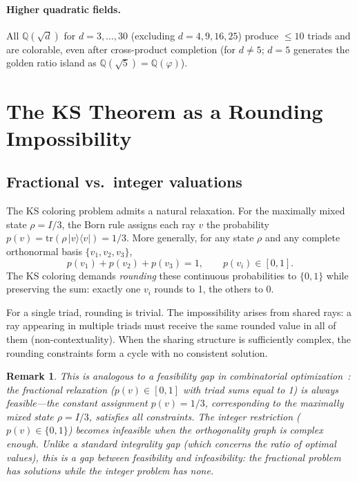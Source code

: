 \documentclass[12pt,a4paper]{article}
\newtheorem{remark}[theorem]{Remark}
\newcommand{\Q}{\mathbb{Q}}
\newcommand{\ket}[1]{|#1\rangle}
\newcommand{\bra}[1]{\langle#1|}
\begin{document}
\paragraph{Higher quadratic fields.} All $\Q(\sqrt{d})$ for $d = 3, \ldots, 30$ (excluding $d = 4, 9, 16, 25$) produce $\leq 10$ triads and are colorable, even after cross-product completion (for $d \neq 5$; $d = 5$ generates the golden ratio island as $\Q(\sqrt{5}) = \Q(\varphi)$).

\section{The KS Theorem as a Rounding Impossibility}\label{sec:rounding}

\subsection{Fractional vs.\ integer valuations}

The KS coloring problem admits a natural relaxation. For the maximally mixed state $\rho = I/3$, the Born rule assigns each ray $v$ the probability $p(v) = \mathrm{tr}(\rho \, \ket{v}\bra{v}) = 1/3$. More generally, for any state $\rho$ and any complete orthonormal basis $\{v_1, v_2, v_3\}$,
\[
p(v_1) + p(v_2) + p(v_3) = 1, \qquad p(v_i) \in [0, 1].
\]
The KS coloring demands \emph{rounding} these continuous probabilities to $\{0, 1\}$ while preserving the sum: exactly one $v_i$ rounds to 1, the others to 0.

For a single triad, rounding is trivial. The impossibility arises from shared rays: a ray appearing in multiple triads must receive the same rounded value in all of them (non-contextuality). When the sharing structure is sufficiently complex, the rounding constraints form a cycle with no consistent solution.

\begin{remark}
This is analogous to a \emph{feasibility gap} in combinatorial optimization~\cite{Vazirani2001}: the \emph{fractional relaxation} ($p(v) \in [0,1]$ with triad sums equal to 1) is always feasible---the constant assignment $p(v) = 1/3$, corresponding to the maximally mixed state $\rho = I/3$, satisfies all constraints. The \emph{integer restriction} ($p(v) \in \{0,1\}$) becomes infeasible when the orthogonality graph is complex enough. Unlike a standard integrality gap (which concerns the ratio of optimal values), this is a gap between \emph{feasibility} and \emph{infeasibility}: the fractional problem has solutions while the integer problem has none.
\end{remark}
\end{document}
